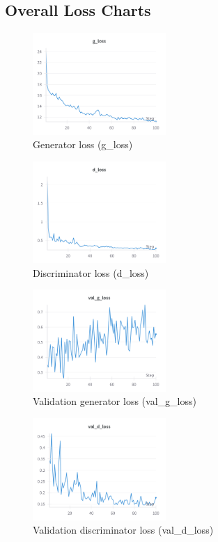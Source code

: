 \documentclass[twocolumn,superscriptaddress,aps]{revtex4-1}
\begin{document}
\subsection{Overall Loss Charts}

\begin{figure}[H]
\centering
\includegraphics[width=0.45\textwidth]{assets/g_loss.png}
\caption{Generator loss (g\_loss)}
\label{fig:g_loss}
\end{figure}

\begin{figure}[H]
\centering
\includegraphics[width=0.45\textwidth]{assets/d_loss.png}
\caption{Discriminator loss (d\_loss)}
\label{fig:d_loss}
\end{figure}

\begin{figure}[H]
\centering
\includegraphics[width=0.45\textwidth]{assets/val_g_loss.png}
\caption{Validation generator loss (val\_g\_loss)}
\label{fig:val_g_loss}
\end{figure}

\begin{figure}[H]
\centering
\includegraphics[width=0.45\textwidth]{assets/val_d_loss.png}
\caption{Validation discriminator loss (val\_d\_loss)}
\label{fig:val_d_loss}
\end{figure}
\end{document}
